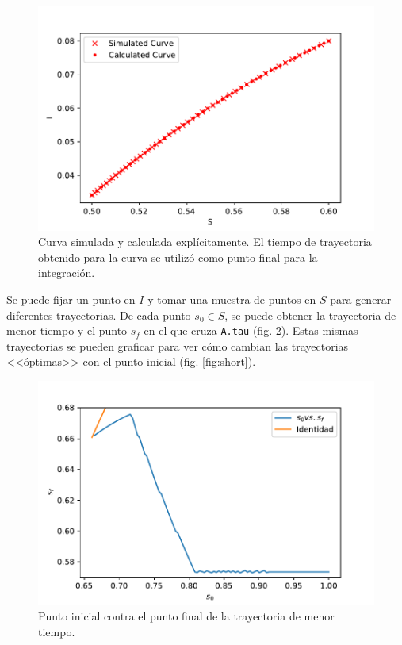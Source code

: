 \documentclass{article}
\begin{document}
\begin{figure}
\includegraphics[width = \textwidth]{integral.pdf}
\caption{Curva simulada y calculada explícitamente. El tiempo de trayectoria obtenido para la curva se utilizó como punto final para la integración.}
\label{fig:integral}
\end{figure}

Se puede fijar un punto en $I$ y tomar una muestra de puntos en $S$ para generar diferentes trayectorias. De cada punto $s_0 \in S$, se puede obtener la trayectoria de menor tiempo y el punto $s_f$ en el que cruza \texttt{A.tau} (fig. \ref{fig:s0_vs_sf}). Estas mismas trayectorias se pueden graficar para ver cómo cambian las trayectorias <<óptimas>> con el punto inicial (fig. \ref{fig:short}).

\begin{figure}
\includegraphics[width = \textwidth]{s0_vs_sf.pdf}
\caption{Punto inicial contra el punto final de la trayectoria de menor tiempo.}
\label{fig:s0_vs_sf}
\end{figure}
\end{document}
